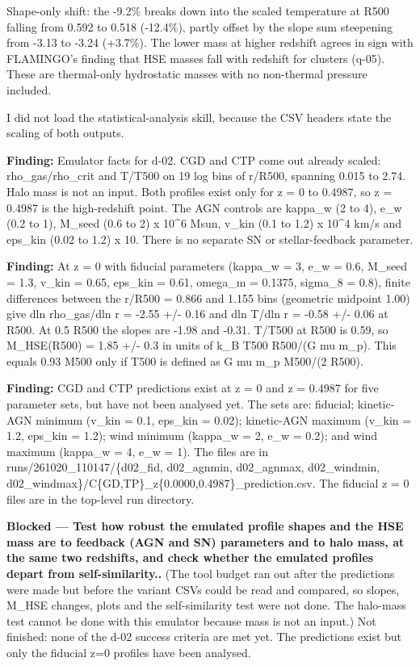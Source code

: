 \documentclass[11pt,a4paper]{article}
\begin{document}
Shape-only shift: the -9.2\% breaks down into the scaled temperature at R500 falling from 0.592 to 0.518 (-12.4\%), partly offset by the slope sum steepening from -3.13 to -3.24 (+3.7\%). The lower mass at higher redshift agrees in sign with FLAMINGO's finding that HSE masses fall with redshift for clusters (q-05). These are thermal-only hydrostatic masses with no non-thermal pressure included.

I did not load the statistical-analysis skill, because the CSV headers state the scaling of both outputs.

\textbf{Finding:} Emulator facts for d-02. CGD and CTP come out already scaled: rho\_gas/rho\_crit and T/T500 on 19 log bins of r/R500, spanning 0.015 to 2.74. Halo mass is not an input. Both profiles exist only for z = 0 to 0.4987, so z = 0.4987 is the high-redshift point. The AGN controls are kappa\_w (2 to 4), e\_w (0.2 to 1), M\_seed (0.6 to 2) x 10\textasciicircum{}6 Msun, v\_kin (0.1 to 1.2) x 10\textasciicircum{}4 km/s and eps\_kin (0.02 to 1.2) x 10. There is no separate SN or stellar-feedback parameter.

\textbf{Finding:} At z = 0 with fiducial parameters (kappa\_w = 3, e\_w = 0.6, M\_seed = 1.3, v\_kin = 0.65, eps\_kin = 0.61, omega\_m = 0.1375, sigma\_8 = 0.8), finite differences between the r/R500 = 0.866 and 1.155 bins (geometric midpoint 1.00) give dln rho\_gas/dln r = -2.55 +/- 0.16 and dln T/dln r = -0.58 +/- 0.06 at R500. At 0.5 R500 the slopes are -1.98 and -0.31. T/T500 at R500 is 0.59, so M\_HSE(R500) = 1.85 +/- 0.3 in units of k\_B T500 R500/(G mu m\_p). This equals 0.93 M500 only if T500 is defined as G mu m\_p M500/(2 R500).

\textbf{Finding:} CGD and CTP predictions exist at z = 0 and z = 0.4987 for five parameter sets, but have not been analysed yet. The sets are: fiducial; kinetic-AGN minimum (v\_kin = 0.1, eps\_kin = 0.02); kinetic-AGN maximum (v\_kin = 1.2, eps\_kin = 1.2); wind minimum (kappa\_w = 2, e\_w = 0.2); and wind maximum (kappa\_w = 4, e\_w = 1). The files are in runs/261020\_110147/\{d02\_fid, d02\_agnmin, d02\_agnmax, d02\_windmin, d02\_windmax\}/C\{GD,TP\}\_z\{0.0000,0.4987\}\_prediction.csv. The fiducial z = 0 files are in the top-level run directory.

\textbf{Blocked --- Test how robust the emulated profile shapes and the HSE mass are to feedback (AGN and SN) parameters and to halo mass, at the same two redshifts, and check whether the emulated profiles depart from self-similarity..} (The tool budget ran out after the predictions were made but before the variant CSVs could be read and compared, so slopes, M\_HSE changes, plots and the self-similarity test were not done. The halo-mass test cannot be done with this emulator because mass is not an input.) Not finished: none of the d-02 success criteria are met yet. The predictions exist but only the fiducial z=0 profiles have been analysed.
\end{document}
